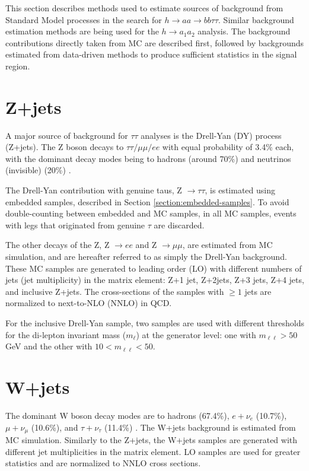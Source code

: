 This section describes methods used to estimate sources of background from Standard Model processes in the search for $h \rightarrow aa \rightarrow bb\tau\tau$. Similar background estimation methods are being used for the $h \rightarrow a_1 a_2$ analysis. The background contributions directly taken from MC are described first, followed by backgrounds estimated from data-driven methods to produce sufficient statistics in the signal region.

\section{Z+jets}

A major source of background for $\tau\tau$ analyses is the Drell-Yan (DY) process (Z+jets). The Z boson decays to $\tau\tau/ \mu\mu/ ee$ with equal probability of 3.4\% each, with the dominant decay modes being to hadrons (around 70\%) and neutrinos (invisible) (20\%) \cite{workman_review_2022}. 

The Drell-Yan contribution with genuine taus, Z $\rightarrow \tau\tau$, is estimated using embedded samples, described in Section \ref{section:embedded-samples}. To avoid double-counting between embedded and MC samples, in all MC samples, events with legs that originated from genuine $\tau$ are discarded.

The other decays of the Z, Z $\rightarrow ee$ and Z $\rightarrow \mu\mu$, are estimated from MC simulation, and are hereafter referred to as simply the Drell-Yan background. These MC samples are generated to leading order (LO) with different numbers of jets (jet multiplicity) in the matrix element: Z+1 jet, Z+2jets, Z+3 jets, Z+4 jets, and inclusive Z+jets. The cross-sections of the samples with $\geq 1$ jets are normalized to next-to-NLO (NNLO) in QCD.

For the inclusive Drell-Yan sample, two samples are used with different thresholds for the di-lepton invariant mass ($m_{\ell}$) at the generator level: one with $m_{\ell\ell} > 50$ GeV and the other with $10 < m_{\ell\ell} < 50$. 

\section{W+jets}

The dominant W boson decay modes are to hadrons (67.4\%), $e + \nu_e$ (10.7\%), $\mu + \nu_\mu$ (10.6\%), and $\tau + \nu_\tau$ (11.4\%) \cite{workman_review_2022}.
The W+jets background is estimated from MC simulation. Similarly to the Z+jets, the W+jets samples are generated with different jet multiplicities in the matrix element. LO samples are used for greater statistics and are normalized to NNLO cross sections. 

